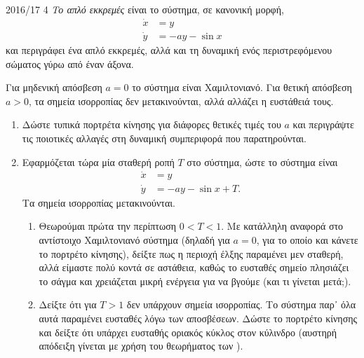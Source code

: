 \begin{exercise}{2016/17 4}
    \emph{Το απλό εκκρεμές} είναι το σύστημα, σε κανονική μορφή,
    \begin{align*}
        \dot{x} &= y \\
        \dot{y} &= -a y - \sin{x}
    \end{align*}
    και περιγράφει ένα απλό εκκρεμές, αλλά και τη δυναμική ενός περιστρεφόμενου
    σώματος γύρω από έναν άξονα.

    Για μηδενική απόσβεση \( a = 0 \) το σύστημα είναι Χαμιλτονιανό. Για θετική
    απόσβεση \( a > 0 \), τα σημεία ισορροπίας δεν μετακινούνται, αλλά αλλάζει η
    ευστάθειά τους.

    \begin{enumerate}[label= (\alph*)]
        \item Δώστε τυπικά πορτρέτα κίνησης για διάφορες θετικές τιμές του
            \( a \) και περιγράψτε τις ποιοτικές αλλαγές στη δυναμική
            συμπεριφορά που παρατηρούνται.
        \item Εφαρμόζεται τώρα μία σταθερή ροπή \( T \) στο σύστημα, ώστε το
            σύστημα είναι
            \begin{align*}
                \dot{x} &= y \\
                \dot{y} &= -a y - \sin{x} + T.
            \end{align*}
            Τα σημεία ισορροπίας μετακινούνται.
            \begin{enumerate}[label= (\roman*)]
                \item Θεωρούμαι πρώτα την περίπτωση \( 0 < T < 1 \). Με κατάλληλη
                    αναφορά στο αντίστοιχο Χαμιλτονιανό σύστημα (δηλαδή για
                    \( a = 0 \), για το οποίο και κάνετε το πορτρέτο
                    κίνησης), δείξτε πως η περιοχή έλξης παραμένει μεν σταθερή, αλλά
                    είμαστε πολύ κοντά σε αστάθεια, καθώς το ευσταθές σημείο
                    πλησιάζει το σάγμα και χρειάζεται μικρή ενέργεια για να βγούμε
                    (και τι γίνεται μετά;).
                \item Δείξτε ότι για \( T > 1 \) δεν υπάρχουν σημεία ισορροπίας.
                    Το σύστημα παρ᾽ όλα αυτά παραμένει ευσταθές λόγω των
                    αποσβέσεων. Δώστε το πορτρέτο κίνησης και δείξτε ότι υπάρχει
                    ευσταθής οριακός κύκλος στον κύλινδρο (αυστηρή απόδειξη
                    γίνεται με χρήση του θεωρήματος των ).
            \end{enumerate}
    \end{enumerate}
\end{exercise}
